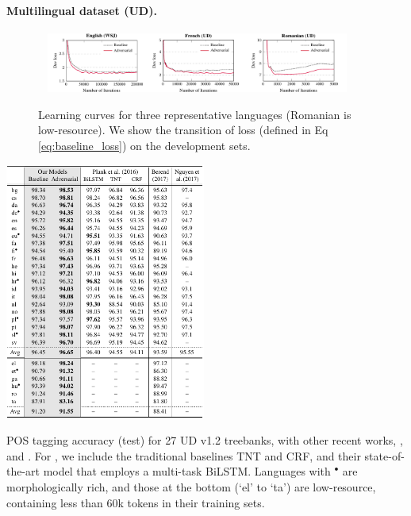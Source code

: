 \documentclass[11pt,a4paper]{article}
\begin{document}
\paragraph{Multilingual dataset (UD).}

\begin{figure}[!h]
    ~\vspace{-1.4mm}%
    \centering
    \includegraphics[width=0.89\textwidth]{pic_loss_curve.pdf}
    \caption{Learning curves for three representative languages (Romanian is low-resource). We show the transition of loss (defined in Eq \protect\ref{eq:baseline_loss}) on the development sets.
    }
    \label{fig:learning_curve}
\vspace{-4mm}
\end{figure}

\begin{table}[!t]
    \hspace{-2mm}\vspace{-1mm}
    \includegraphics[width=0.495\textwidth]{tbl_ud_s.pdf}
    \caption{
    POS tagging accuracy (test) for 27 UD v1.2 treebanks, with other recent works,  \protect{}, \protect{} and \protect{}.
    For \protect{}, we include the traditional baselines TNT and CRF, and their state-of-the-art model that employs a multi-task BiLSTM.
    Languages with $^\bullet$ are morphologically rich, and 
    those at the bottom (`el' to `ta') are low-resource, containing less than 60k tokens in their training sets.
    }
\label{tbl:ud_results}
\vspace{-4mm}
\end{table}
\end{document}
